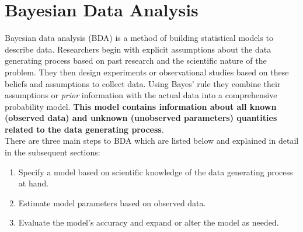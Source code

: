 \documentclass{article}
\begin{document}
\section{Bayesian Data Analysis}
Bayesian data analysis (BDA) is a method of building statistical models to describe data.  Researchers begin with explicit assumptions about the data generating process based on past research and the scientific nature of the problem. They then design experiments or observational studies based on these beliefs and assumptions to collect data. Using Bayes' rule they combine their assumptions or \textit{prior} information with the actual data into a comprehensive probability model. \textbf{This model contains information about all known (observed data) and unknown (unobserved parameters) quantities related to the data generating process}. \\
There are three main steps to BDA which are listed below and explained in detail in the subsequent sections:
\begin{enumerate}
\item Specify a model based on scientific knowledge of the data generating process at hand.
\item Estimate model parameters based on observed data.
\item Evaluate the model's accuracy and expand or alter the model as needed.
\end{enumerate}
\end{document}
